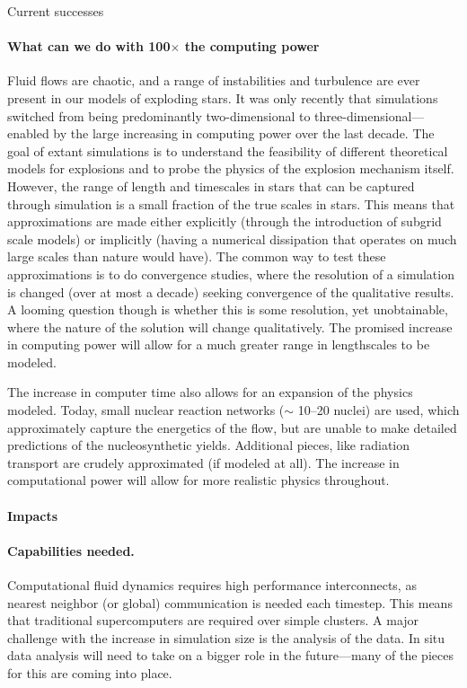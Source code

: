 \documentclass[11pt]{article}
\begin{document}
Current successes


\paragraph*{What can we do with 100$\times$ the computing power}

Fluid flows are chaotic, and a range of instabilities and turbulence
are ever present in our models of exploding stars.  It was only
recently that simulations switched from being predominantly
two-dimensional to three-dimensional---enabled by the large increasing
in computing power over the last decade.  The goal of extant
simulations is to understand the feasibility of different theoretical
models for explosions and to probe the physics of the explosion
mechanism itself.  However, the range of length and timescales in
stars that can be captured through simulation is a small fraction of
the true scales in stars.  This means that approximations are made
either explicitly (through the introduction of subgrid scale models)
or implicitly (having a numerical dissipation that operates on much
large scales than nature would have).  The common way to test these
approximations is to do convergence studies, where the resolution of a
simulation is changed (over at most a decade) seeking convergence of
the qualitative results.  A looming question though is whether this is
some resolution, yet unobtainable, where the nature of the solution
will change qualitatively.  The promised increase in computing power
will allow for a much greater range in lengthscales to be modeled.

The increase in computer time also allows for an expansion of the
physics modeled.  Today, small nuclear reaction networks ($\sim$
10--20 nuclei) are used, which approximately capture the energetics of
the flow, but are unable to make detailed predictions of the
nucleosynthetic yields.  Additional pieces, like radiation transport
are crudely approximated (if modeled at all).  The increase in
computational power will allow for more realistic physics throughout.



\paragraph*{Impacts}




\paragraph*{Capabilities needed.}  Computational fluid dynamics requires 
high performance interconnects, as nearest neighbor (or global)
communication is needed each timestep.  This means that traditional
supercomputers are required over simple clusters.  A major challenge
with the increase in simulation size is the analysis of the data.  In
situ data analysis will need to take on a bigger role in the future---many
of the pieces for this are coming into place.
\end{document}
